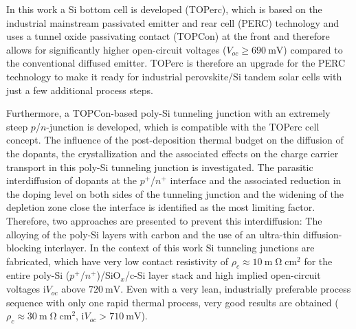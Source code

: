 In this work a Si bottom cell is developed (TOPerc), which is based on the industrial mainstream passivated emitter and rear cell (PERC) technology and uses a tunnel oxide passivating contact (TOPCon) at the front and therefore allows for significantly higher open-circuit voltages ($V_{oc} \ge 690 ~\textrm{mV}$) compared to the conventional diffused emitter.
TOPerc is therefore an upgrade for the PERC technology to make it ready for industrial perovskite/Si tandem solar cells with just a few additional process steps. 

Furthermore, a TOPCon-based poly-Si tunneling junction with an extremely steep $p$/$n$-junction is developed, which is compatible with the TOPerc cell concept.
The influence of the post-deposition thermal budget on the diffusion of the dopants, the crystallization and the associated effects on the charge carrier transport in this poly-Si tunneling junction is investigated. 
The parasitic interdiffusion of dopants at the $p^+$/$n^+$ interface and the associated reduction in the doping level on both sides of the tunneling junction and the widening of the depletion zone close the interface is identified as the most limiting factor.
Therefore, two approaches are presented to prevent this interdiffusion: The alloying of the poly-Si layers with carbon and the use of an ultra-thin diffusion-blocking interlayer.
In the context of this work Si tunneling junctions are fabricated, which have very low contact resistivity of $\rho_{c} \approx 10 ~\textrm{m}\upOmega\textrm{cm}^2$ for the entire poly-Si ($p^+$/$n^+$)/SiO$_x$/c-Si layer stack and high implied open-circuit voltages i$V_{oc}$ above $720 ~\textrm{mV}$.
Even with a very lean, industrially preferable process sequence with only one rapid thermal process, very good results are obtained ($\rho_{c} \approx 30 ~\textrm{m}\upOmega\textrm{cm}^2$, i$V_{oc} > 710 ~\textrm{mV}$). 

\clearpage